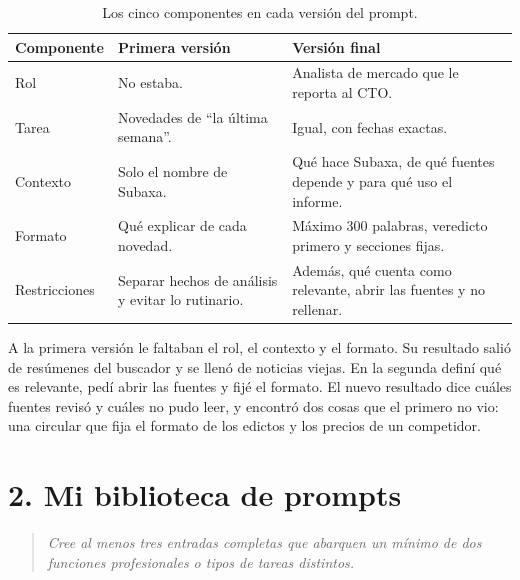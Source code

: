 \documentclass[11pt,letterpaper]{article}
\newcommand{\pregunta}[1]{%
  \begin{quote}\color{cGris}\small\itshape #1\end{quote}}
\newcommand{\resultado}[2]{%
  \begin{tcolorbox}[breakable,colback=cFondo,colframe=cEje,
    boxrule=0.5pt,arc=1.5pt,left=7pt,right=7pt,top=5pt,bottom=5pt,
    title={#1},fonttitle=\small\bfseries]
  \footnotesize\setlength{\parskip}{0.35em}\raggedright
  
  \end{tcolorbox}}
\begin{document}
\begin{table}[htbp]\centering\small
\caption{Los cinco componentes en cada versión del prompt.}
\begin{tabularx}{0.95\textwidth}{@{}lXX@{}}
\toprule
Componente & Primera versión & Versión final \\
\midrule
Rol           & No estaba. & Analista de mercado que le reporta al CTO. \\
Tarea         & Novedades de \enquote{la última semana}. & Igual, con fechas exactas. \\
Contexto      & Solo el nombre de Subaxa. & Qué hace Subaxa, de qué fuentes depende y para qué uso el informe. \\
Formato       & Qué explicar de cada novedad. & Máximo 300 palabras, veredicto primero y secciones fijas. \\
Restricciones & Separar hechos de análisis y evitar lo rutinario. & Además, qué cuenta como relevante, abrir las fuentes y no rellenar. \\
\bottomrule
\end{tabularx}
\end{table}

A la primera versión le faltaban el rol, el contexto y el formato. Su
resultado salió de resúmenes del buscador y se llenó de noticias
viejas. En la segunda definí qué es relevante, pedí abrir las fuentes y
fijé el formato. El nuevo resultado dice cuáles fuentes revisó y cuáles no
pudo leer, y encontró dos cosas que el primero no vio: una circular que fija
el formato de los edictos y los precios de un competidor.

\resultado{Resultado de la primera versión}{resultado-v1.tex}
\resultado{Resultado de la versión final}{resultado-v2.tex}

\clearpage
\section*{2. Mi biblioteca de prompts}

\pregunta{Cree al menos tres entradas completas que abarquen un mínimo de
dos funciones profesionales o tipos de tareas distintos.}

\end{document}
